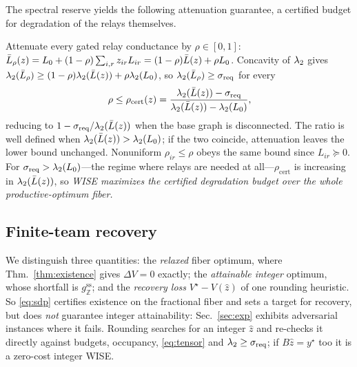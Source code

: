 The spectral reserve yields the following attenuation guarantee, a certified budget for
degradation of the relays themselves.

\begin{corollary}\label{cor:budget}
Attenuate every gated relay conductance by $\rho\in[0,1]$:
$\bar L_\rho(z)=L_0+(1-\rho)\sum_{i,r}z_{ir}L_{ir}=(1-\rho)\bar L(z)+\rho L_0$. Concavity of
$\lambda_2$ gives $\lambda_2(\bar L_\rho)\ge(1-\rho)\lambda_2(\bar L(z))+\rho\lambda_2(L_0)$, so
$\lambda_2(\bar L_\rho)\ge\sigma_{\mathrm{req}}$ for every
\begin{equation}
\rho\le\rho_{\mathrm{cert}}(z)=
\frac{\lambda_2(\bar L(z))-\sigma_{\mathrm{req}}}{\lambda_2(\bar L(z))-\lambda_2(L_0)},
\label{eq:budget}
\end{equation}
reducing to $1-\sigma_{\mathrm{req}}/\lambda_2(\bar L(z))$ when the base graph is disconnected. The ratio is
well defined when $\lambda_2(\bar L(z))>\lambda_2(L_0)$; if the two coincide, attenuation leaves the
lower bound unchanged. Nonuniform
$\rho_{ir}\le\rho$ obeys the same bound since $L_{ir}\succeq0$. For
$\sigma_{\mathrm{req}}>\lambda_2(L_0)$---the regime where relays are needed at all---$\rho_{\mathrm{cert}}$
is increasing in $\lambda_2(\bar L(z))$, so \emph{WISE maximizes the certified degradation budget
over the whole productive-optimum fiber.}
\end{corollary}

\subsection{Finite-team recovery}
We distinguish three quantities: the \emph{relaxed} fiber optimum, where
Thm.~\ref{thm:existence} gives $\Delta V=0$ exactly; the \emph{attainable integer} optimum,
whose shortfall is $g_{\mathbb Z}^{\mathrm{ss}}$; and the \emph{recovery loss}
$V^{\star}-V(\hat z)$ of one rounding heuristic. So \eqref{eq:sdp} certifies existence on the
fractional fiber and sets a target for recovery, but does \emph{not} guarantee integer
attainability: Sec.~\ref{sec:exp} exhibits adversarial instances where it fails. Rounding
searches for an integer $\hat z$ and re-checks it directly against budgets, occupancy,
\eqref{eq:tensor} and $\lambda_2\ge\sigma_{\mathrm{req}}$; if $B\hat z=y^{\star}$ too it is a zero-cost
integer WISE.
